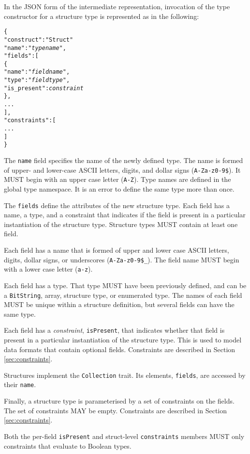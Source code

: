 \documentclass[10pt,twocolumn,a4paper]{article}
\newcommand{\code}[1]{\texttt{#1}}
\begin{document}
In the JSON form of the intermediate representation, invocation of the type
constructor for a structure type is represented as in the following:
\footnotesize
\begin{alltt}
  \{
    "construct"   : "Struct"
    "name"        : "\emph{type name}",
    "fields"      : [
      \{
        "name"       : "\emph{field name}",
        "type"       : "\emph{field type}",
        "is\_present" : \emph{constraint}
      \},
      ...
    ],
    "constraints" : [
      ...
    ]
  \}
\end{alltt}
\normalsize
The \code{name} field specifies the name of the newly defined type. The
name is formed of upper- and lower-case ASCII letters, digits, and dollar
signs (\code{A-Za-z0-9\$}).  It MUST begin with an upper case letter
(\code{A-Z}). Type names are defined in the global type namespace.
It is an error to define the same type more than once.

The \code{fields} define the attributes of the new structure type. Each
field has a name, a type, and a constraint that indicates if the field is
present in a particular instantiation of the structure type. Structure
types MUST contain at least one field.

Each field has a name that is formed of upper and lower case ASCII letters,
digits, dollar signs, or underscores (\code{A-Za-z0-9\$\_}). The field name
MUST begin with a lower case letter (\code{a-z}).

Each field has a type. That type MUST have been previously defined, and can
be a \code{BitString}, array, structure type, or enumerated type. The names
of each field MUST be unique within a structure definition, but several
fields can have the same type.

Each field has a \emph{constraint}, \code{isPresent}, that indicates
whether that field is present in a particular instantiation of the
structure type. This is used to model data formats that contain optional
fields. Constraints are described in Section \ref{sec:constraints}.

Structures implement the \code{Collection} trait. Its elements, \code{fields}, are
accessed by their \code{name}.

Finally, a structure type is parameterised by a set of constraints on the
fields. The set of constraints MAY be empty. Constraints are described in
Section \ref{sec:constraints}.

Both the per-field \code{isPresent} and struct-level \code{constraints} members MUST
only constraints that evaluate to Boolean types.
\end{document}

